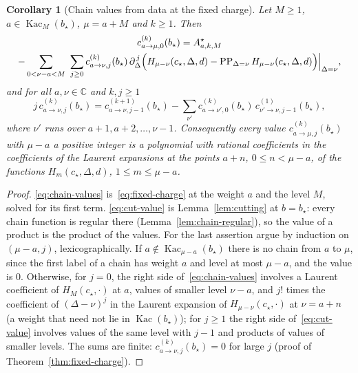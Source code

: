 \documentclass[twoside,10pt]{article}
\numberwithin{equation}{section}
\theoremstyle{slbody}
\newtheorem{corollary}[theorem]{Corollary}
\theoremstyle{definition}
\theoremstyle{remark}
\newcommand{\PP}{\operatorname{PP}}
\begin{document}
\begin{corollary}[Chain values from data at the fixed charge]\label{cor:chain-values}
Let $M\geq1$, $a\in\operatorname{Kac}_M(b_\star)$, $\mu=a+M$ and $k\geq1$.  Then
\begin{multline}\label{eq:chain-values}
 c^{(k)}_{a\to\mu,0}(b_\star)=A^\star_{a,k,M}\\
 -\sum_{0<\nu-a<M}\ \sum_{j\geq0}c^{(k)}_{a\to\nu,j}(b_\star)\,
 \partial_\Delta^{\,j}\Bigl(H_{\mu-\nu}(c_\star,\Delta,d)
 -\PP_{\Delta=\nu}H_{\mu-\nu}(c_\star,\Delta,d)\Bigr)\Big|_{\Delta=\nu},
\end{multline}
and for all $a,\nu\in\mathbb C$ and $k,j\geq1$
\begin{equation}\label{eq:cut-value}
 j\,c^{(k)}_{a\to\nu,j}(b_\star)=c^{(k+1)}_{a\to\nu,j-1}(b_\star)
 -\sum_{\nu'}c^{(k)}_{a\to\nu',0}(b_\star)\,c^{(1)}_{\nu'\to\nu,j-1}(b_\star),
\end{equation}
where $\nu'$ runs over $a+1,a+2,\dots,\nu-1$.  Consequently every value
$c^{(k)}_{a\to\mu,j}(b_\star)$ with $\mu-a$ a positive integer is a polynomial
with rational coefficients in the coefficients of the Laurent expansions at the
points $a+n$, $0\leq n<\mu-a$, of the functions $H_m(c_\star,\Delta,d)$,
$1\leq m\leq\mu-a$.
\end{corollary}

\begin{proof}
\eqref{eq:chain-values} is~\eqref{eq:fixed-charge} at the weight $a$ and the
level $M$, solved for its first term.  \eqref{eq:cut-value} is
Lemma~\ref{lem:cutting} at $b=b_\star$: every chain function is regular there
(Lemma~\ref{lem:chain-regular}), so the value of a product is the product of
the values.  For the last assertion argue by induction on $(\mu-a,j)$,
lexicographically.  If $a\notin\operatorname{Kac}_{\mu-a}(b_\star)$ there is no
chain from $a$ to $\mu$, since the first label of a chain has weight $a$ and
level at most $\mu-a$, and the value is $0$.  Otherwise, for $j=0$, the right
side of~\eqref{eq:chain-values} involves a Laurent coefficient of
$H_M(c_\star,\cdot)$ at $a$, values of smaller level $\nu-a$, and
$j!$ times the coefficient of $(\Delta-\nu)^j$ in the Laurent expansion of
$H_{\mu-\nu}(c_\star,\cdot)$ at $\nu=a+n$ (a weight that need not lie in
$\operatorname{Kac}(b_\star)$); for $j\geq1$ the right side
of~\eqref{eq:cut-value} involves values of the same level with $j-1$ and
products of values of smaller levels.  The sums are finite:
$c^{(k)}_{a\to\nu,j}(b_\star)=0$ for large $j$ (proof of
Theorem~\ref{thm:fixed-charge}).
\end{proof}
\end{document}
